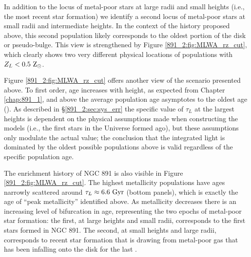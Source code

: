 In addition to the locus of metal-poor stars at large radii and small
heights (i.e., the most recent star formation) we identify a second
locus of metal-poor stars at small radii and intermediate heights. In
the context of the history proposed above, this second population
likely corresponds to the oldest portion of the disk or
pseudo-bulge. This view is strengthened by Figure
\ref{891_2:fig:MLWA_rz_cut}, which clearly shows two very different
physical locations of populations with $Z_L < 0.5~\mathrm{\mathrm{Z}_{\odot}} $.

Figure \ref{891_2:fig:MLWA_rz_cut} offers another view of the scenario
presented above. To first order, age increases with height, as
expected from Chapter \ref{chap:891_1}, and above  the
average population age asymptotes to the oldest age (). As described in \S\ref{891_2:sec:sys_err} the specific
value of $\tau_L$ at the largest heights is dependent on the physical
assumptions made when constructing the models (i.e., the first stars
in the Universe formed  ago), but these assumptions
only modulate the actual value; the conclusion that the integrated
light is dominated by the oldest possible populations above
 is valid regardless of the specific population age.

The enrichment history of NGC 891 is also visible in Figure
\ref{891_2:fig:MLWA_rz_cut}. The highest metallicity populations have
ages narrowly scattered around $\tau_L \approx 6.6~\mathrm{Gyr} $ (bottom
panels), which is exactly the age of ``peak metallicity'' identified
above. As metallicity decreases there is an increasing level of
bifurcation in age, representing the two epochs of metal-poor star
formation: the first, at large heights and small radii, corresponds to
the first stars formed in NGC 891. The second, at small heights and
large radii, corresponds to recent star formation that is drawing from
metal-poor gas that has been infalling onto the disk for the last
.



